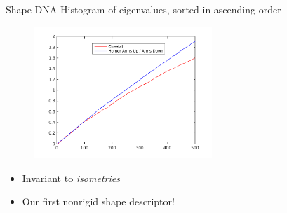\documentclass{beamer}
\begin{document}
\begin{frame}{Shape DNA}
Histogram of eigenvalues, sorted in ascending order

\begin{figure}[t]
    \includegraphics[width=0.6\textwidth]{ShapeDNA.pdf}
\end{figure}

\begin{itemize}[label=$\vartriangleright$]
\item Invariant to {\em isometries}
\item Our first nonrigid shape descriptor!
\end{itemize}
\end{frame}
\end{document}
